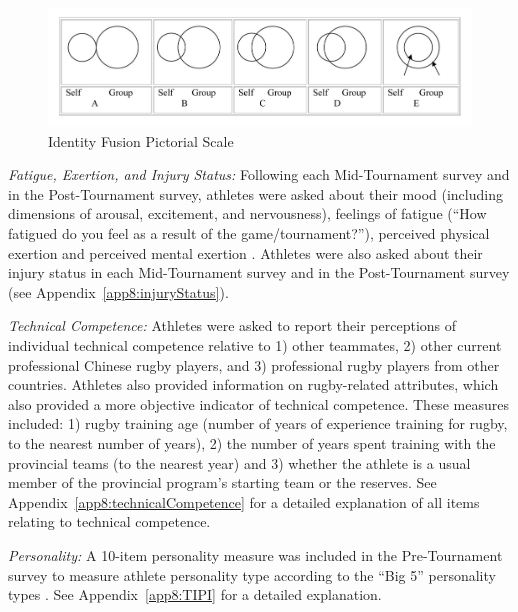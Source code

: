 \begin{CJK}{UTF8}{gbsn}



\begin{figure}[htbp]
  \includegraphics[width=\linewidth]{images/Identity_Fusion_Pictorial_Scale.png}
  \caption{Identity Fusion Pictorial Scale}
  \label{fig:fusionPictorialGroup}
\end{figure}




\textit{Fatigue, Exertion, and Injury Status:} Following each Mid-Tournament survey and in the Post-Tournament survey, athletes were asked about their mood (including dimensions of arousal, excitement, and nervousness), feelings of fatigue (``How fatigued do you feel as a result of the game/tournament?''), perceived physical exertion \citep[Borg RPE scale;][]{Borg1990} and perceived mental exertion \citep[see][]{Noakes2012a}. Athletes were also asked about their injury status in each Mid-Tournament survey and in the Post-Tournament survey (see Appendix~\ref{app8:injuryStatus}).

\textit{Technical Competence:} Athletes were asked to report their perceptions of individual technical competence relative to 1) other teammates, 2) other current professional Chinese rugby players, and  3) professional rugby players from other countries.  Athletes also provided information on rugby-related attributes, which also provided a more objective indicator of technical competence.  These measures included: 1) rugby training age (number of years of experience training for rugby, to the nearest number of years), 2) the number of years spent training with the provincial teams (to the nearest year) and 3) whether the athlete is a usual member of the provincial program's starting team or the reserves.  See Appendix~\ref{app8:technicalCompetence} for a detailed explanation of all items relating to technical competence.

\textit{Personality:} A 10-item personality measure was included in the Pre-Tournament survey to measure athlete personality type according to the ``Big 5'' personality types \citep[Ten Item Personality Index - TIPI.  The 5 types are: Extraversion, Agreeableness, Conscientiousness, Emotional Stability (Neuroticism reverse coded), and Openness to Experiences; see][]{Gosling2003}. See Appendix~\ref{app8:TIPI} for a detailed explanation.


\end{CJK}
